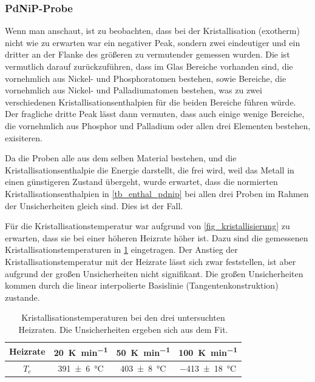 \documentclass[
	a4paper,
	12pt,
	pagesize,
	ngerman
]{scrartcl}
\begin{document}
	\subsubsection*{PdNiP-Probe}
	Wenn man  anschaut, ist zu beobachten, dass bei der Kristallisation (exotherm) nicht wie zu erwarten war ein negativer Peak, sondern zwei eindeutiger und ein dritter an der Flanke des größeren zu vermutender gemessen wurden. %
	Die ist vermutlich darauf zurückzuführen, dass im Glas Bereiche vorhanden sind, die vornehmlich aus Nickel- und Phosphoratomen bestehen, sowie Bereiche, die vornehmlich aus Nickel- und Palladiumatomen bestehen, was zu zwei verschiedenen Kristallisationsenthalpien für die beiden Bereiche führen würde.
	Der fragliche dritte Peak lässt dann vermuten, dass auch einige wenige Bereiche, die vornehmlich aus Phosphor und Palladium oder allen drei Elementen bestehen, exisiteren. %

	Da die Proben alle aus dem selben Material bestehen, und die Kristallisationsenthalpie die Energie darstellt, die frei wird, weil das Metall in einen günstigeren Zustand übergeht, wurde erwartet, dass die normierten Kristallisationsenthalpien in \cref{tb_enthal_pdnip} bei allen drei Proben im Rahmen der Unsicherheiten gleich sind.
	Dies ist der Fall.

	Für die Kristallisationstemperatur war aufgrund von \cref{fig_kristallisierung} zu erwarten, dass sie bei einer höheren Heizrate höher ist.
	Dazu sind die gemessenen Kristallisationstemperaturen in \cref{tb_kristall_temp} eingetragen.
	Der Anstieg der Kristallisationstemperatur mit der Heizrate lässt sich zwar feststellen, ist aber aufgrund der großen Unsicherheiten nicht signifikant.
	Die großen Unsicherheiten kommen durch die linear interpolierte Basislinie (Tangentenkonstruktion) zustande.

	\begin{table}[H]
			\centering
			\begin{tabular}{c | c | c | c  }
				 Heizrate & \SI{20}{\kelvin \per \minute} & \SI{50}{\kelvin \per \minute}  & \SI{100}{\kelvin \per \minute} \\ \hline
				 $T_c$ & \SI{391 \pm 6}{\celsius}&\SI{403 \pm 8}{\celsius} & \SI{-413 \pm 18}{\celsius}
			\end{tabular}
			\caption{
			Kristallisationstemperaturen bei den drei untersuchten Heizraten. Die Unsicherheiten ergeben sich aus dem Fit.
			}
			\label{tb_kristall_temp}
	\end{table}
\end{document}
